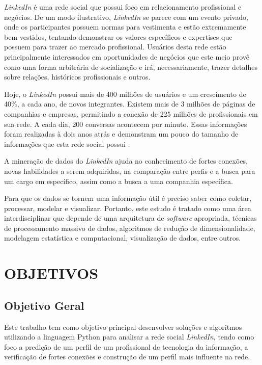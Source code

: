 \textit{LinkedIn} é uma rede social que possui foco em relacionamento profissional e negócios. De um modo ilustrativo, \textit{LinkedIn} se parece com um evento privado, onde os participantes possuem normas para vestimenta e estão extremamente bem vestidos, tentando demonstrar os valores específicos e expertises que possuem para trazer ao mercado profissional. Usuários desta rede estão principalmente interessados em oportunidades de negócios que este meio provê como uma forma arbitrária de socialização e irá, necessariamente, trazer detalhes sobre relações, históricos profissionais e outros.

Hoje, o \textit{LinkedIn} possui mais de 400 milhões de usuários e um crescimento de 40\%, a cada ano, de novos integrantes. Existem mais de 3 milhões de páginas de companhias e empresas, permitindo a conexão de 225 milhões de profissionais em sua rede. A cada dia, 200 conversas acontecem por minuto. Essas informações foram realizadas à dois anos atrás e demonstram um pouco do tamanho de informações que esta rede social possui \cite{linkedin-about}.

A mineração de dados do \textit{LinkedIn} ajuda no conhecimento de fortes conexões, novas habilidades a serem adquiridas, na comparação entre perfis e a busca para um cargo em específico, assim como a busca a uma companhia específica.

Para que os dados se tornem uma informação útil é preciso saber como coletar, processar, modelar e visualizar. Portanto, este estudo é tratado como uma área interdisciplinar que depende de uma arquitetura de \textit{software} apropriada, técnicas de processamento massivo de dados, algoritmos de redução de dimensionalidade, modelagem estatística e computacional, visualização de dados, entre outros.


\section{OBJETIVOS}\label{sec:objetivos}

\subsection{Objetivo Geral}

Este trabalho tem como objetivo principal desenvolver soluções e algoritmos utilizando a linguagem Python para analisar a rede social \textit{LinkedIn}, tendo como foco a predição de um perfil de um profissional de tecnologia da informação, a verificação de fortes conexões e construção de um perfil mais influente na rede.

